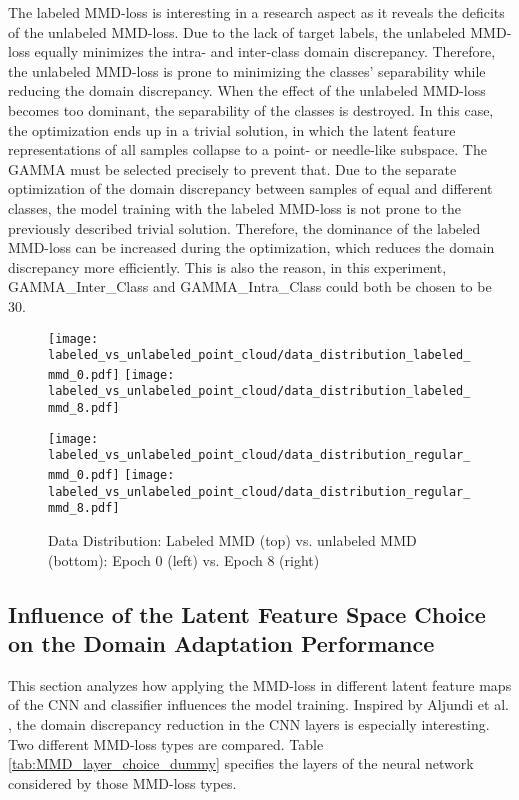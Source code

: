 The labeled MMD-loss is interesting in a research aspect as it reveals the deficits of the unlabeled MMD-loss. Due to the lack of target labels, the unlabeled MMD-loss equally minimizes the intra- and inter-class domain discrepancy. Therefore, the unlabeled MMD-loss is prone to minimizing the classes' separability while reducing the domain discrepancy. When the effect of the unlabeled MMD-loss becomes too dominant, the separability of the classes is destroyed. In this case, the optimization ends up in a trivial solution, in which the latent feature representations of all samples collapse to a point- or needle-like subspace. The GAMMA must be selected precisely to prevent that. Due to the separate optimization of the domain discrepancy between samples of equal and different classes, the model training with the labeled MMD-loss is not prone to the previously described trivial solution. Therefore, the dominance of the labeled MMD-loss can be increased during the optimization, which reduces the domain discrepancy more efficiently. This is also the reason, in this experiment, GAMMA\_Inter\_Class and GAMMA\_Intra\_Class could both be chosen to be 30.


\begin{figure}[htp]
  \centering
  \texttt{[image: labeled\_vs\_unlabeled\_point\_cloud/data\_distribution\_labeled\_mmd\_0.pdf]}
  \hspace{.4cm}
  \texttt{[image: labeled\_vs\_unlabeled\_point\_cloud/data\_distribution\_labeled\_mmd\_8.pdf]}

  \vspace{.1cm}

  \texttt{[image: labeled\_vs\_unlabeled\_point\_cloud/data\_distribution\_regular\_mmd\_0.pdf]}
  \hspace{.4cm}
  \texttt{[image: labeled\_vs\_unlabeled\_point\_cloud/data\_distribution\_regular\_mmd\_8.pdf]}
  
  \caption{Data Distribution: Labeled MMD (top) vs. unlabeled MMD (bottom): Epoch 0 (left) vs. Epoch 8 (right)}
  \label{fig:point_cloud_labeled_unlabeled_mmd}
\end{figure}

\subsection{Influence of the Latent Feature Space Choice on the Domain Adaptation Performance}
\label{cnn_mmd_dummy}

This section analyzes how applying the MMD-loss in different latent feature maps of the CNN and classifier influences the model training. Inspired by Aljundi et al. \cite{Aljundi2016}, the domain discrepancy reduction in the CNN layers is especially interesting. Two different MMD-loss types are compared. Table \ref{tab:MMD_layer_choice_dummy} specifies the layers of the neural network considered by those MMD-loss types.

